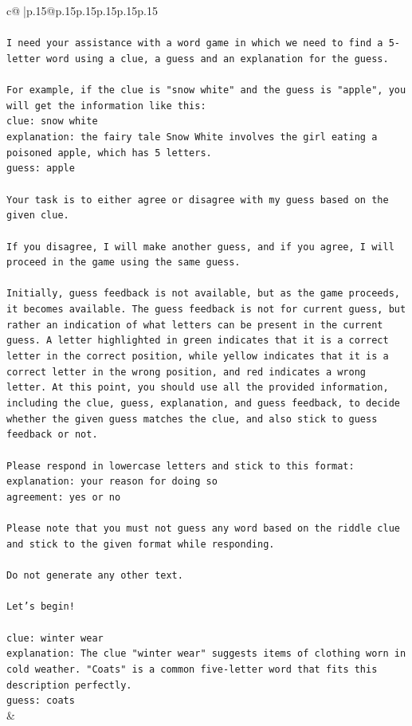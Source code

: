 \documentclass{article}
\begin{document}
{\begin{supertabular}{c@{$\;$}|p{.15\linewidth}@{}p{.15\linewidth}p{.15\linewidth}p{.15\linewidth}p{.15\linewidth}p{.15\linewidth}}
{{{\\ 
\\ 
\texttt{I need your assistance with a word game in which we need to find a 5{-}letter word using a clue, a guess and an explanation for the guess.} \\
\\ 
\texttt{For example, if the clue is "snow white" and the guess is "apple", you will get the information like this:} \\
\texttt{clue: snow white} \\
\texttt{explanation: the fairy tale Snow White involves the girl eating a poisoned apple, which has 5 letters.} \\
\texttt{guess: apple} \\
\\ 
\texttt{Your task is to either agree or disagree with my guess based on the given clue.} \\
\\ 
\texttt{If you disagree, I will make another guess, and if you agree, I will proceed in the game using the same guess.} \\
\\ 
\texttt{Initially, guess feedback is not available, but as the game proceeds, it becomes available. The guess feedback is not for current guess, but rather an indication of what letters can be present in the current guess. A letter highlighted in green indicates that it is a correct letter in the correct position, while yellow indicates that it is a correct letter in the wrong position, and red indicates a wrong letter. At this point, you should use all the provided information, including the clue, guess, explanation, and guess feedback, to decide whether the given guess matches the clue, and also stick to guess feedback or not.} \\
\\ 
\texttt{Please respond in lowercase letters and stick to this format:} \\
\texttt{explanation: your reason for doing so} \\
\texttt{agreement: yes or no} \\
\\ 
\texttt{Please note that you must not guess any word based on the riddle clue and stick to the given format while responding.} \\
\\ 
\texttt{Do not generate any other text.} \\
\\ 
\texttt{Let's begin!} \\
\\ 
\texttt{clue: winter wear} \\
\texttt{explanation: The clue "winter wear" suggests items of clothing worn in cold weather. "Coats" is a common five{-}letter word that fits this description perfectly.} \\
\texttt{guess: coats} \\
            }
        }
    }
    & \\ \\


\end{supertabular}}
\end{document}
